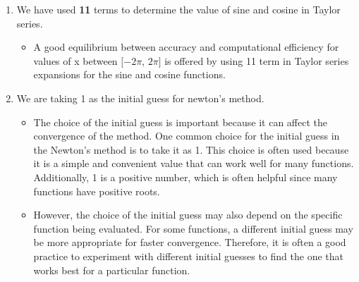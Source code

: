 \begin{enumerate}
    \item We have used \textbf{11} terms to determine the value of sine and cosine in Taylor series.

\begin{itemize}
    \item A good equilibrium between accuracy and computational efficiency for values of x between $[−2\pi$, $2\pi]$ is offered by using 11 term in Taylor series expansions for the sine and cosine functions.
\end{itemize}

\item We are taking 1 as the initial guess for newton’s method.
\begin{itemize}
    \item The choice of the initial guess is important because it can affect the convergence of the method. One common choice for the initial guess in the Newton's method is to take it as 1. This choice is often used because it is a simple and convenient value that can work well for many functions. Additionally, 1 is a positive number, which is often helpful since many functions have positive roots.
    \item However, the choice of the initial guess may also depend on the specific function being evaluated. For some functions, a different initial guess may be more appropriate for faster convergence. Therefore, it is often a good practice to experiment with different initial guesses to find the one that works best for a particular function.
\end{itemize}


\end{enumerate}
